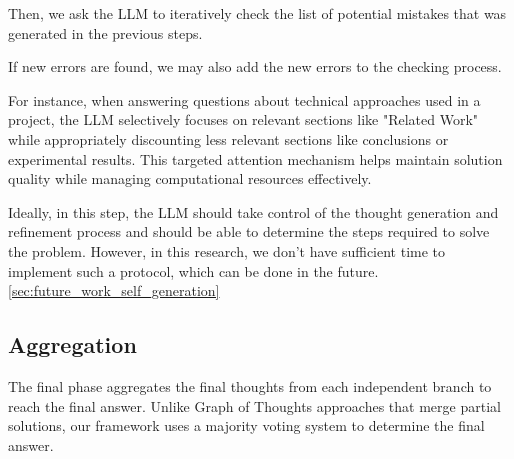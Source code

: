 \documentclass{article}
\begin{document}
Then, we ask the LLM to iteratively check the list of potential mistakes that was generated in the previous steps.

If new errors are found, we may also add the new errors to the checking process.

For instance, when answering questions about technical approaches used in a project, the LLM selectively focuses on relevant sections like "Related Work" while appropriately discounting less relevant sections like conclusions or experimental results. This targeted attention mechanism helps maintain solution quality while managing computational resources effectively.

Ideally, in this step, the LLM should take control of the thought generation and refinement process and should be able to determine the steps required to solve the problem. However, in this research, we don't have sufficient time to implement such a protocol, which can be done in the future. \ref{sec:future_work_self_generation}

\subsection{Aggregation}

The final phase aggregates the final thoughts from each independent branch to reach the final answer. Unlike Graph of Thoughts approaches that merge partial solutions, our framework uses a majority voting system to determine the final answer.
\end{document}
